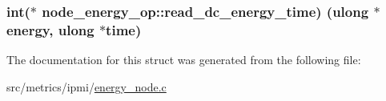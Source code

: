 \subsubsection[{\texorpdfstring{read\+\_\+dc\+\_\+energy\+\_\+time}{read_dc_energy_time}}]{\setlength{\rightskip}{0pt plus 5cm}int($\ast$ node\+\_\+energy\+\_\+op\+::read\+\_\+dc\+\_\+energy\+\_\+time) ({\bf ulong} $\ast${\bf energy}, {\bf ulong} $\ast$time)}\hypertarget{structnode__energy__op_a7e0bf1be9d7679bbd525b8fc0a72c784}{}\label{structnode__energy__op_a7e0bf1be9d7679bbd525b8fc0a72c784}


The documentation for this struct was generated from the following file\+:\begin{DoxyCompactItemize}
\item 
src/metrics/ipmi/\hyperlink{energy__node_8c}{energy\+\_\+node.\+c}\end{DoxyCompactItemize}
